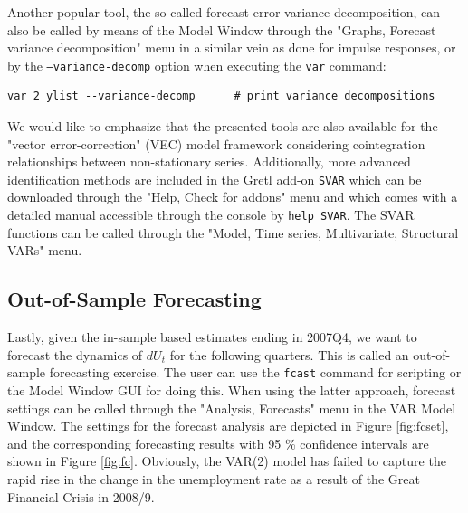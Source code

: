 \documentclass[11pt]{article}
\begin{document}
Another popular tool, the so called forecast error variance decomposition, can also be called by means of the Model Window through the "Graphs, Forecast variance decomposition" menu in a similar vein as done for impulse responses, or by the \texttt{---variance-decomp} option when executing the \texttt{var} command:
\begin{Verbatim}[baselinestretch=0.75, fontsize=\small]
var 2 ylist --variance-decomp      # print variance decompositions
\end{Verbatim}


 We would  like to emphasize that the presented tools are also available for the "vector error-correction" (VEC) model framework considering cointegration relationships between non-stationary series. Additionally, more advanced identification methods are included in the Gretl add-on \texttt{SVAR} which can be downloaded through the "Help, Check for addons" menu and which comes with a detailed manual accessible through the console by \texttt{help SVAR}. The SVAR functions can be called through the "Model, Time series, Multivariate, Structural VARs" menu.

\subsection{Out-of-Sample Forecasting}
Lastly, given the in-sample based estimates ending in 2007Q4, we want to forecast the dynamics of $ dU_t $ for the following quarters. This is called an out-of-sample forecasting exercise. The user can use the \texttt{fcast} command for scripting or the Model Window GUI for doing this. When using the latter approach, forecast settings can be called through the "Analysis, Forecasts" menu in the VAR Model Window. The settings for the forecast analysis are depicted in Figure \ref{fig:fcset}, and the corresponding forecasting results with 95 \% confidence intervals are shown in Figure \ref{fig:fc}. Obviously, the VAR(2) model has failed to capture the rapid rise in the change in the unemployment rate as a result of the Great Financial Crisis in 2008/9. %

\end{document}
